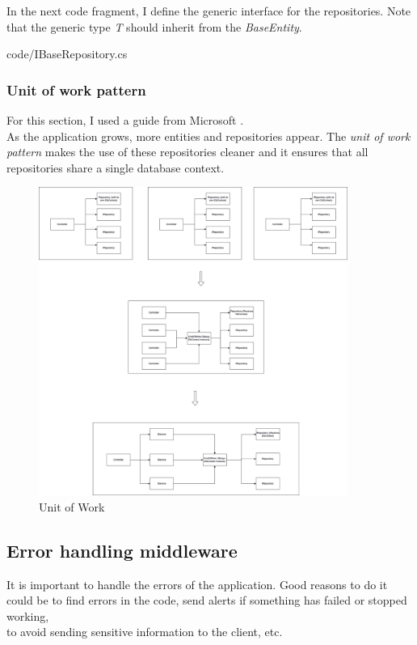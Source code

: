             In the next code fragment, I define the generic interface for the repositories. Note that the generic type \textit{T} should inherit from the \textit{BaseEntity}.
            
            {code/IBaseRepository.cs}

        \subsubsection{Unit of work pattern}
            For this section, I used a guide from Microsoft \cite{RepoAndUW}. \\
            As the application grows, more entities and repositories appear. The \textit{unit of work pattern} makes the use of these repositories cleaner and it ensures that all repositories share a single database context. \\

            \begin{figure}[H]
                \centering
                    \includegraphics[width=0.9\textwidth]{assets/diagrams/unitofwork.png}
                \caption{Unit of Work}
                \label{fig:implementation_unit_work}
            \end{figure}
    
    \subsection{Error handling middleware}
        It is important to handle the errors of the application. Good reasons to do it could be to find errors in the code, send alerts if something has failed or stopped working, \\
        to avoid sending sensitive information to the client, etc. \\

